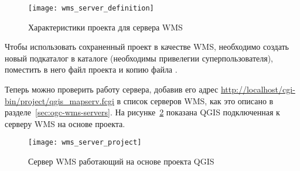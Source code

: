 \begin{figure}[ht]
\centering
\texttt{[image: wms\_server\_definition]}
\caption{Характеристики проекта для сервера WMS \nixcaption}
\label{fig:wmsdefinition}
\end{figure}

Чтобы использовать сохраненный проект в качестве WMS, необходимо создать
новый подкаталог в каталоге  (необходимы
привелегии суперпользователя), поместить в него файл проекта 
и копию файла .

Теперь можно проверить работу сервера, добавив его адрес
\url{http://localhost/cgi-bin/project/qgis\_mapserv.fcgi} в список серверов
WMS, как это описано в разделе~\ref{sec:ogc-wms-servers}. На рисунке~\ref{fig:wmsproject}
показана QGIS подключенная к серверу WMS на основе проекта.

\begin{figure}[ht]
\centering
\texttt{[image: wms\_server\_project]}
\caption{Сервер WMS работающий на основе проекта QGIS \nixcaption}
\label{fig:wmsproject}
\end{figure}

\FloatBarrier
